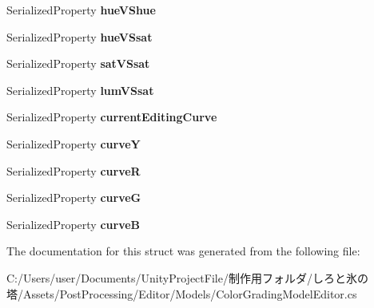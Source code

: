 \begin{DoxyCompactItemize}
Serialized\+Property {\bfseries hue\+V\+Shue}
\item 
\mbox{\label{struct_unity_editor_1_1_post_processing_1_1_color_grading_model_editor_1_1_curves_settings_a3b4cfc00d3aa69f1729a29340612e2b0}} 
Serialized\+Property {\bfseries hue\+V\+Ssat}
\item 
\mbox{\label{struct_unity_editor_1_1_post_processing_1_1_color_grading_model_editor_1_1_curves_settings_acbfe70fd188ef11ecb07e5725f5d8ae0}} 
Serialized\+Property {\bfseries sat\+V\+Ssat}
\item 
\mbox{\label{struct_unity_editor_1_1_post_processing_1_1_color_grading_model_editor_1_1_curves_settings_a47bf3a801e618507382bc7c7dcf48685}} 
Serialized\+Property {\bfseries lum\+V\+Ssat}
\item 
\mbox{\label{struct_unity_editor_1_1_post_processing_1_1_color_grading_model_editor_1_1_curves_settings_a38d154d748cb98deb6de86df5228eff4}} 
Serialized\+Property {\bfseries current\+Editing\+Curve}
\item 
\mbox{\label{struct_unity_editor_1_1_post_processing_1_1_color_grading_model_editor_1_1_curves_settings_a48f12ebed7d88d061a8f0c363dbeef46}} 
Serialized\+Property {\bfseries curveY}
\item 
\mbox{\label{struct_unity_editor_1_1_post_processing_1_1_color_grading_model_editor_1_1_curves_settings_a0f2353af26fdd01c1b7adf1fb8b94f37}} 
Serialized\+Property {\bfseries curveR}
\item 
\mbox{\label{struct_unity_editor_1_1_post_processing_1_1_color_grading_model_editor_1_1_curves_settings_a6a127398e404a187eef9ad85e789f110}} 
Serialized\+Property {\bfseries curveG}
\item 
\mbox{\label{struct_unity_editor_1_1_post_processing_1_1_color_grading_model_editor_1_1_curves_settings_a9f150dc93a4bf2161fe4a43ac8f6e26d}} 
Serialized\+Property {\bfseries curveB}
\end{DoxyCompactItemize}


The documentation for this struct was generated from the following file\+:\begin{DoxyCompactItemize}
\item 
C\+:/\+Users/user/\+Documents/\+Unity\+Project\+File/制作用フォルダ/しろと氷の塔/\+Assets/\+Post\+Processing/\+Editor/\+Models/Color\+Grading\+Model\+Editor.\+cs\end{DoxyCompactItemize}
